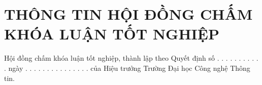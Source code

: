 \chapter*{THÔNG TIN HỘI ĐỒNG CHẤM KHÓA LUẬN TỐT NGHIỆP}

Hội đồng chấm khóa luận tốt nghiệp, thành lập theo Quyết định số . . . . . . . . . . . ngày  . . . . . . . . . . . . . . . của Hiệu trưởng Trường Đại học Công nghệ Thông tin.
